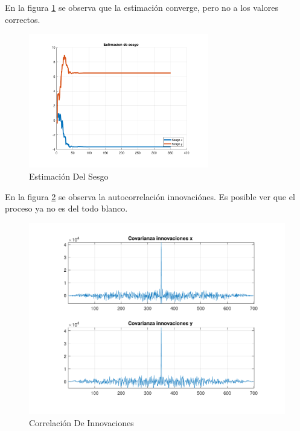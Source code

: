	En la figura \ref{fig:ej4c_bias} se observa que la estimación converge, pero no a los valores correctos.
	
	\begin{figure}[H]
		\centering
		\includegraphics[width=0.7\textwidth,keepaspectratio]{Figuras/bias_ej4c.pdf}
		\caption{Estimación Del Sesgo}
		\label{fig:ej4c_bias}
	\end{figure}
	
	En la figura \ref{fig:ej4c_cov} se observa la autocorrelación innovaciónes. Es posible ver que el proceso ya no es del todo blanco.
	
	\begin{figure}[H]
		\centering
		\includegraphics[width=1.0\textwidth,keepaspectratio]{Figuras/covinn_ej4c.pdf}
		\caption{Correlación De Innovaciones}
		\label{fig:ej4c_cov}
	\end{figure}
	

